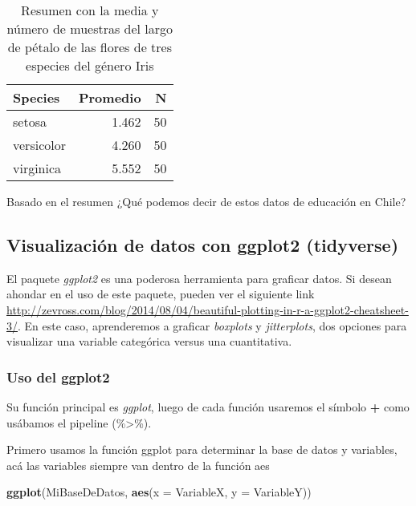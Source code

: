\documentclass[]{book}
\newenvironment{Shaded}{\begin{snugshade}}{\end{snugshade}}
\newcommand{\KeywordTok}[1]{\textcolor[rgb]{0.13,0.29,0.53}{\textbf{#1}}}
\newcommand{\DataTypeTok}[1]{\textcolor[rgb]{0.13,0.29,0.53}{#1}}
\newcommand{\NormalTok}[1]{#1}
\begin{document}
\begin{table}

\caption{\label{tab:MediaIris}Resumen con la media y número de muestras del largo de pétalo de las flores de tres especies del género Iris}
\centering
\begin{tabular}[t]{lrr}
\toprule
Species & Promedio & N\\
\midrule
setosa & 1.462 & 50\\
versicolor & 4.260 & 50\\
virginica & 5.552 & 50\\
\bottomrule
\end{tabular}
\end{table}

Basado en el resumen ¿Qué podemos decir de estos datos de educación en
Chile?

\subsection{Visualización de datos con ggplot2
(tidyverse)}\label{visualizacion-de-datos-con-ggplot2-tidyverse}

El paquete \emph{ggplot2} \citep{WickhamGG2016} es una poderosa
herramienta para graficar datos. Si desean ahondar en el uso de este
paquete, pueden ver el siguiente link
\url{http://zevross.com/blog/2014/08/04/beautiful-plotting-in-r-a-ggplot2-cheatsheet-3/}.
En este caso, aprenderemos a graficar \emph{boxplots} y
\emph{jitterplots}, dos opciones para visualizar una variable categórica
versus una cuantitativa.

\subsubsection{Uso del ggplot2}\label{uso-del-ggplot2}

Su función principal es \emph{ggplot}, luego de cada función usaremos el
símbolo \textbf{+} como usábamos el pipeline (\%\textgreater{}\%).

Primero usamos la función ggplot para determinar la base de datos y
variables, acá las variables siempre van dentro de la función aes

\begin{Shaded}
\begin{Highlighting}[]
\KeywordTok{ggplot}\NormalTok{(MiBaseDeDatos, }\KeywordTok{aes}\NormalTok{(}\DataTypeTok{x =}\NormalTok{ VariableX, }\DataTypeTok{y =}\NormalTok{ VariableY)) }
\end{Highlighting}
\end{Shaded}
\end{document}
